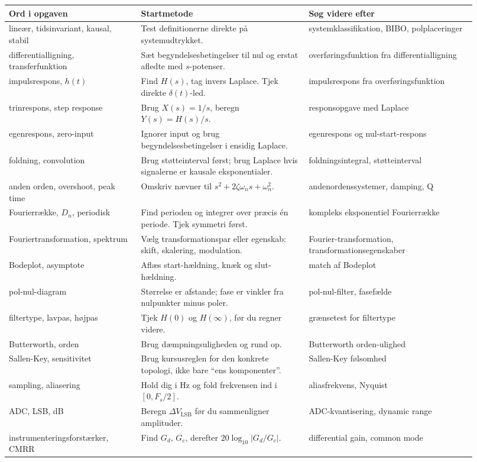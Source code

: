 \begin{tabular}{p{0.26\linewidth}p{0.33\linewidth}p{0.33\linewidth}}
\toprule
Ord i opgaven & Startmetode & Søg videre efter \\
\midrule
lineær, tidsinvariant, kausal, stabil & Test definitionerne direkte på systemudtrykket. & systemklassifikation, BIBO, polplaceringer \\
differentialligning, transferfunktion & Sæt begyndelsesbetingelser til nul og erstat afledte med \(s\)-potenser. & overføringsfunktion fra differentialligning \\
impulsrespons, \(h(t)\) & Find \(H(s)\), tag invers Laplace. Tjek direkte \(\delta(t)\)-led. & impulsrespons fra overføringsfunktion \\
trinrespons, step response & Brug \(X(s)=1/s\), beregn \(Y(s)=H(s)/s\). & responsopgave med Laplace \\
egenrespons, zero-input & Ignorer input og brug begyndelsesbetingelser i ensidig Laplace. & egenrespons og nul-start-respons \\
foldning, convolution & Brug støtteinterval først; brug Laplace hvis signalerne er kausale eksponentialer. & foldningsintegral, støtteinterval \\
anden orden, overshoot, peak time & Omskriv nævner til \(s^2+2\zeta\omega_ns+\omega_n^2\). & andenordenssystemer, damping, Q \\
Fourierrække, \(D_n\), periodisk & Find perioden og integrer over præcis én periode. Tjek symmetri først. & kompleks eksponentiel Fourierrække \\
Fouriertransformation, spektrum & Vælg transformationspar eller egenskab: skift, skalering, modulation. & Fourier-transformation, transformationsegenskaber \\
Bodeplot, asymptote & Aflæs start-hældning, knæk og slut-hældning. & match af Bodeplot \\
pol-nul-diagram & Størrelse er afstande; fase er vinkler fra nulpunkter minus poler. & pol-nul-filter, fasefælde \\
filtertype, lavpas, højpas & Tjek \(H(0)\) og \(H(\infty)\), før du regner videre. & grænsetest for filtertype \\
Butterworth, orden & Brug dæmpningsuligheden og rund op. & Butterworth orden-ulighed \\
Sallen-Key, sensitivitet & Brug kursusreglen for den konkrete topologi, ikke bare ``ens komponenter''. & Sallen-Key følsomhed \\
sampling, aliasering & Hold dig i Hz og fold frekvensen ind i \([0,F_s/2]\). & aliasfrekvens, Nyquist \\
ADC, LSB, dB & Beregn \(\Delta V_{\mathrm{LSB}}\) før du sammenligner amplituder. & ADC-kvantisering, dynamic range \\
instrumenteringsforstærker, CMRR & Find \(G_d\), \(G_c\), derefter \(20\log_{10}|G_d/G_c|\). & differential gain, common mode \\
\bottomrule
\end{tabular}

